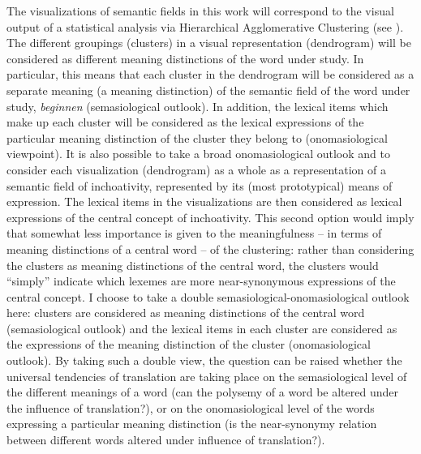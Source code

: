 The visualizations of semantic fields in this work will correspond to the visual output of a statistical analysis via Hierarchical Agglomerative Clustering (see ). The different groupings (clusters) in a visual representation (dendrogram) will be considered as different meaning distinctions of the word under study. In particular, this means that each cluster in the dendrogram will be considered as a separate meaning (a meaning distinction) of the semantic field of the word under study, \textit{beginnen} (semasiological outlook). In addition, the lexical items which make up each cluster will be considered as the lexical expressions of the particular meaning distinction of the cluster they belong to (onomasiological viewpoint). It is also possible to take a broad onomasiological outlook and to consider each visualization (dendrogram) as a whole as a representation of a semantic field of inchoativity, represented by its (most prototypical) means of expression. The lexical items in the visualizations are then considered as lexical expressions of the central concept of inchoativity. This second option would imply that somewhat less importance is given to the meaningfulness – in terms of meaning distinctions of a central word – of the clustering: rather than considering the clusters as meaning distinctions of the central word, the clusters would ``simply'' indicate which lexemes are more near-synonymous expressions of the central concept. I choose to take a double semasiological-onomasiological outlook here: clusters are considered as meaning distinctions of the central word (semasiological outlook) and the lexical items in each cluster are considered as the expressions of the meaning distinction of the cluster (onomasiological outlook). By taking such a double view, the question can be raised whether the universal tendencies of translation are taking place on the semasiological level of the different meanings of a word (can the polysemy of a word be altered under the influence of translation?), or on the onomasiological level of the words expressing a particular meaning distinction (is the near-synonymy relation between different words altered under influence of translation?).

